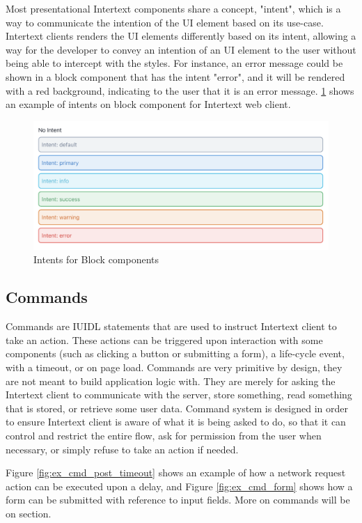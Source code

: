 Most presentational Intertext components share a concept, "intent", which is a way to communicate the intention of the UI element based on its use-case. Intertext clients renders the UI elements differently based on its intent, allowing a way for the developer to convey an intention of an UI element to the user without being able to intercept with the styles. For instance, an error message could be shown in a block component that has the intent "error", and it will be rendered with a red background, indicating to the user that it is an error message. \ref{fig:intents} shows an example of intents on block component for Intertext web client.

\begin{figure}
  \centering
  \includegraphics[width=13cm]{thesis/paper/images/intents.png}
  \caption{Intents for Block components}%
  \label{fig:intents}%
\end{figure}

\subsection{Commands}

Commands are IUIDL statements that are used to instruct Intertext client to take an action. These actions can be triggered upon interaction with some components (such as clicking a button or submitting a form), a life-cycle event, with a timeout, or on page load. Commands are very primitive by design, they are not meant to build application logic with. They are merely for asking the Intertext client to communicate with the server, store something, read something that is stored, or retrieve some user data. Command system is designed in order to ensure Intertext client is aware of what it is being asked to do, so that it can control and restrict the entire flow, ask for permission from the user when necessary, or simply refuse to take an action if needed. 

Figure \ref{fig:ex_cmd_post_timeout} shows an example of how a network request action can be executed upon a delay, and Figure \ref{fig:ex_cmd_form} shows how a form can be submitted with reference to input fields. More on commands will be on  section.

